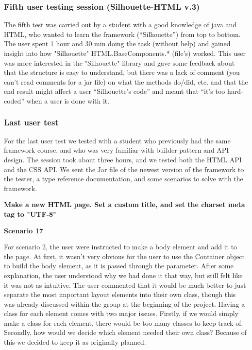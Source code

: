 \documentclass[12pt]{article}
\begin{document}
        \subsubsection{Fifth user testing session (Silhouette-HTML v.3)}

        The fifth test was carried out by a student with a good knowledge of java and HTML, who wanted to learn the framework (“Silhouette”) from top to bottom. The user spent 1 hour and 30 min doing the task (without help) and gained insight into how "Silhouette" HTML.BaseComponents.* (file's) worked. This user was more interested in the "Silhouette" library and gave some feedback about that the structure is easy to understand, but there was a lack of comment (you can't read comments for a jar file) on what the methods do/did, etc. and that the end result might affect a user “Silhouette’s code” and meant that “it’s too hard-coded” when a user is done with it.

        \subsubsection{Last user test}

        For the last user test we tested with a student who previously had the same framework course, and who was very familiar with builder pattern and API design. The session took about three hours, and we tested both the HTML API and the CSS API. We sent the Jar file of the newest version of the framework to the tester, a type reference documentation, and some scenarios to solve with the framework.

        \textbf{Make a new HTML page. Set a custom title, and set the charset meta tag to "UTF-8"}

        \textbf{Scenario 17}

        For scenario 2, the user were instructed to make a body element and add it to the page. At first, it wasn't very obvious for the user to use the Container object to build the body element, as it is passed through the parameter. After some explanation, the user understood why we had done it that way, but still felt like it was not as intuitive. The user commented that it would be much better to just separate the most important layout elements into their own class, though this was already discussed within the group at the beginning of the project. Having a class for each element comes with two major issues. Firstly, if we would simply make a class for each element, there would be too many classes to keep track of. Secondly, how would we decide which element needed their own class? Because of this we decided to keep it as originally planned.
\end{document}
